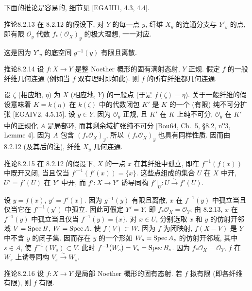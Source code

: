 下面的推论是容易的, 细节见 [EGAIII1, 4.3, 4.4].

\begin{origstatement}{推论}{8.2.13}\label{ch08:cor8213}
在 8.2.12 的假设下, 对 $Y$ 的每一点 $y$, 纤维 $X_y$ 的连通分支与 $Y'_y$ 的点, 即有限 $\mathcal O_y$ 代数 $f_*(\mathcal O_X)_y$ 的极大理想, 一一对应.
\end{origstatement}
这是因为 $Y'_y$ 的底空间 $g^{-1}(y)$ 有限且离散.

\begin{origstatement}{推论}{8.2.14}\label{ch08:cor8214}
设 $f:X\to Y$ 是整 Noether 概形的固有满射态射, $Y$ 正规. 假定 $f$ 的一般纤维几何连通 (例如当 $f$ 双有理时即如此). 则 $f$ 的所有纤维都几何连通.
\end{origstatement}
设 $\zeta$ (相应地, $\eta$) 为 $X$ (相应地, $Y$) 的一般点 (于是 $f(\zeta)=\eta$). 关于一般纤维的假设意味着 $K=k(\eta)$ 在 $k(\zeta)$ 中的代数闭包 $K'$ 是 $K$ 的一个 (有限) 纯不可分扩张 [EGAIV2, 4.5.15]. 设 $y\in Y$. 因为 $\mathcal O_y$ 正规, 且 $K'$ 在 $K$ 上纯不可分, $\mathcal O_y$ 在 $K'$ 中的正规化 $A$ 是局部环, 而其剩余域扩张纯不可分 [Bou64, Ch.~5, §8.2, n\textsuperscript{o}3, Lemme 4]. 因为 $A$ 包含 $(f_*\mathcal O_X)_y$, 所以 $(f_*\mathcal O_X)_y$ 也具有同样性质. 因而由 8.2.12 (及其后的注), 纤维 $X_y$ 几何连通.

\begin{origstatement}{推论}{8.2.15}\label{ch08:cor8215}
在 8.2.12 的假设下, $X$ 的一点 $x$ 在其纤维中孤立, 即在 $f^{-1}(f(x))$ 中既开又闭, 当且仅当 $f'^{-1}(f'(x))=\{x\}$. 这些点组成的集合 $U$ 在 $X$ 中开, $U'=f'(U)$ 在 $Y'$ 中开, 而 $f':X\to Y'$ 诱导同构 $f'|_U:U\xrightarrow\sim f'(U)$.
\end{origstatement}
设 $y=f(x)$, $y'=f'(x)$. 因为 $g^{-1}(y)$ 有限且离散, $x$ 在 $f^{-1}(y)$ 中孤立当且仅当它在 $f'^{-1}(y')$ 中孤立. 因此可假定 $Y'=Y$, 即 $f_*\mathcal O_X=\mathcal O_Y$; 由 8.2.13, $x$ 在 $f^{-1}(y)$ 中孤立当且仅当 $f^{-1}(y)=\{x\}$. 对 $x\in U$, 分别选取 $x$ 和 $y$ 的仿射开邻域 $V=\operatorname{Spec} B$, $W=\operatorname{Spec} A$, 使 $f(V)\subset W$. 因为 $f$ 为闭映射, $f(X-V)$ 是 $Y$ 中不含 $y$ 的闭子集. 因而存在 $y$ 的一个形如 $W_s=\operatorname{Spec} A_s$ 的仿射开邻域, 其中 $s\in A$, 使 $f^{-1}(W_s)\subset V$. 此时 $f^{-1}(W_s)=V_s=\operatorname{Spec} B_s$. 因为 $f_*\mathcal O_X=\mathcal O_Y$, $f$ 在 $W_s$ 上诱导同构 $V_s\xrightarrow\sim W_s$.

\begin{origstatement}{推论}{8.2.16}\label{ch08:cor8216}
设 $f:X\to Y$ 是局部 Noether 概形的固有态射. 若 $f$ 拟有限 (即各纤维有限), 则 $f$ 有限.
\end{origstatement}

